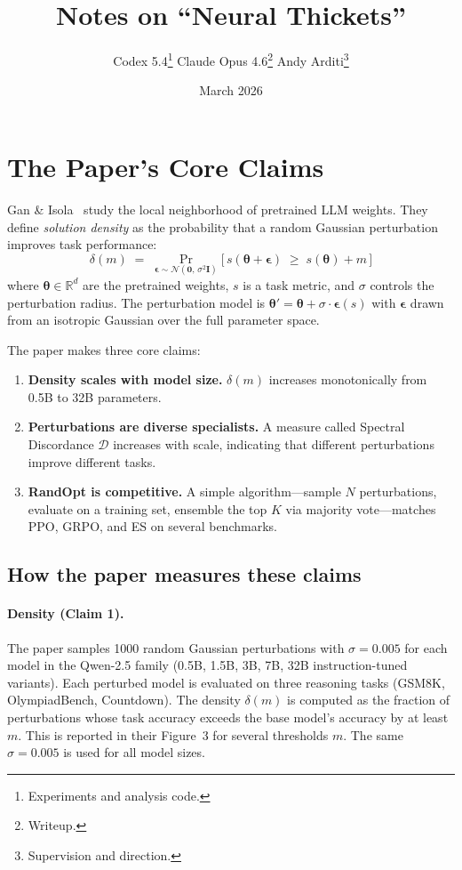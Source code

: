\documentclass[11pt]{article}
\title{Notes on ``Neural Thickets''}
\author{
Codex 5.4\thanks{Experiments and analysis code.} \quad
Claude Opus 4.6\thanks{Writeup.} \quad
Andy Arditi\thanks{Supervision and direction.}
}
\date{March 2026}
\begin{document}
\maketitle

\section{The Paper's Core Claims}\label{sec:paper}

Gan \& Isola~\cite{gan2026thickets} study the local neighborhood of pretrained LLM weights. They define \emph{solution density} as the probability that a random Gaussian perturbation improves task performance:
\begin{equation}\label{eq:density}
  \delta(m) \;=\; \Pr_{\boldsymbol{\epsilon}\sim\mathcal{N}(\mathbf{0},\,\sigma^2\mathbf{I})}\!\bigl[\,s(\boldsymbol{\theta}+\boldsymbol{\epsilon}) \;\ge\; s(\boldsymbol{\theta})+m\,\bigr]
\end{equation}
where $\boldsymbol{\theta}\in\mathbb{R}^d$ are the pretrained weights, $s$ is a task metric, and $\sigma$ controls the perturbation radius. The perturbation model is $\boldsymbol{\theta}' = \boldsymbol{\theta} + \sigma\cdot\boldsymbol{\epsilon}(s)$ with $\boldsymbol{\epsilon}$ drawn from an isotropic Gaussian over the full parameter space.

The paper makes three core claims:

\begin{enumerate}
  \item \textbf{Density scales with model size.} $\delta(m)$ increases monotonically from 0.5B to 32B parameters.
  \item \textbf{Perturbations are diverse specialists.} A measure called Spectral Discordance $\mathcal{D}$ increases with scale, indicating that different perturbations improve different tasks.
  \item \textbf{RandOpt is competitive.} A simple algorithm---sample $N$ perturbations, evaluate on a training set, ensemble the top $K$ via majority vote---matches PPO, GRPO, and ES on several benchmarks.
\end{enumerate}

\subsection{How the paper measures these claims}\label{sec:paper_method}

\paragraph{Density (Claim 1).} The paper samples 1000 random Gaussian perturbations with $\sigma=0.005$ for each model in the Qwen-2.5 family (0.5B, 1.5B, 3B, 7B, 32B instruction-tuned variants). Each perturbed model is evaluated on three reasoning tasks (GSM8K, OlympiadBench, Countdown). The density $\delta(m)$ is computed as the fraction of perturbations whose task accuracy exceeds the base model's accuracy by at least $m$. This is reported in their Figure~3 for several thresholds $m$. The same $\sigma=0.005$ is used for all model sizes.
\end{document}
